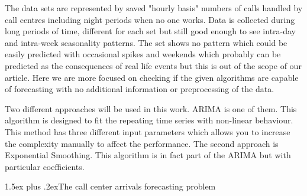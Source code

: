 \documentclass[12pt,a4paper]{article}
\makeatletter
\renewcommand{\section}{\@startsection{section}{1}{18pt}{3.25ex plus 1ex minus 0.2ex}%
{1.5ex plus .2ex}{\bfseries\rmfamily\Large}}
\theoremstyle{myplain}
\numberwithin{equation}{section}
\makeatother
\begin{document}
The data sets are represented by saved "hourly basis" numbers of calls handled by call centres including night periods when no one works. Data is collected during long periods of time, different for each set but still good enough to see intra-day and intra-week seasonality patterns. The set shows no pattern which could be easily predicted with occasional spikes and weekends which probably can be predicted as the consequences of real life events but this is out of the scope of our article. Here we are more focused on checking if the given algorithms are capable of forecasting with no additional information or preprocessing of the data.


Two different approaches will be used in this work. ARIMA is one of them. This algorithm is designed to fit the repeating time series with non-linear behaviour. This method has three different input parameters which allows you to increase the complexity manually to affect the performance. The second approach is Exponential Smoothing. This algorithm is in fact part of the ARIMA but with particular coefficients.

\section{The call center arrivals forecasting problem}

\end{document}
